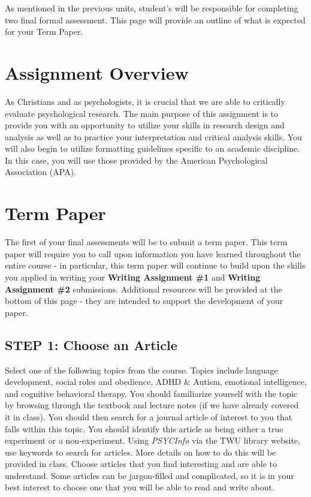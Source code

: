 \documentclass[
]{book}
\begin{document}
As mentioned in the previous units, student's will be responsible for completing two final formal assessment. This page will provide an outline of what is expected for your Term Paper.

\hypertarget{assignment-overview}{%
\section*{Assignment Overview}\label{assignment-overview}}

As Christians and as psychologists, it is crucial that we are able to critically evaluate psychological research. The main purpose of this assignment is to provide you with an opportunity to utilize your skills in research design and analysis as well as to practice your interpretation and critical analysis skills. You will also begin to utilize formatting guidelines specific to an academic discipline. In this case, you will use those provided by the American Psychological Association (APA).

\hypertarget{term-paper}{%
\section{Term Paper}\label{term-paper}}

The first of your final assessments will be to submit a term paper. This term paper will require you to call upon information you have learned throughout the entire course - in particular, this term paper will continue to build upon the skills you applied in writing your \textbf{Writing Assignment \#1} and \textbf{Writing Assignment \#2} submissions. Additional resources will be provided at the bottom of this page - they are intended to support the development of your paper.

\hypertarget{step-1-choose-an-article}{%
\subsection*{STEP 1: Choose an Article}\label{step-1-choose-an-article}}

Select one of the following topics from the course. Topics include language development, social roles and obedience, ADHD \& Autism, emotional intelligence, and cognitive behavioral therapy. You should familiarize yourself with the topic by browsing through the textbook and lecture notes (if we have already covered it in class).
You should then search for a journal article of interest to you that falls within this topic. You should identify this article as being either a true experiment or a non-experiment. Using \emph{PSYCInfo} via the TWU library website, use keywords to search for articles. More details on how to do this will be provided in class. Choose articles that you find interesting and are able to understand. Some articles can be jargon-filled and complicated, so it is in your best interest to choose one that you will be able to read and write about.
\end{document}

